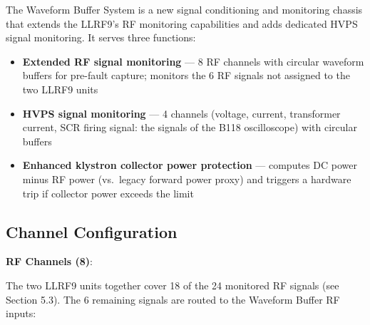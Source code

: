 The Waveform Buffer System is a new signal conditioning and monitoring chassis that extends the LLRF9's RF monitoring capabilities and adds dedicated HVPS signal monitoring. It serves three functions:

\begin{itemize}
\tightlist
\item
  \textbf{Extended RF signal monitoring} --- 8 RF channels with circular waveform buffers for pre-fault capture; monitors the 6 RF signals not assigned to the two LLRF9 units
\item
  \textbf{HVPS signal monitoring} --- 4 channels (voltage, current, transformer current, SCR firing signal: the signals of the B118 oscilloscope) with circular buffers
\item
  \textbf{Enhanced klystron collector power protection} --- computes DC power minus RF power (vs.~legacy forward power proxy) and triggers a hardware trip if collector power exceeds the limit
\end{itemize}

\subsection{Channel Configuration}\label{channel-configuration}

\textbf{RF Channels (8)}:

The two LLRF9 units together cover 18 of the 24 monitored RF signals (see Section 5.3). The 6 remaining signals are routed to the Waveform Buffer RF inputs:

